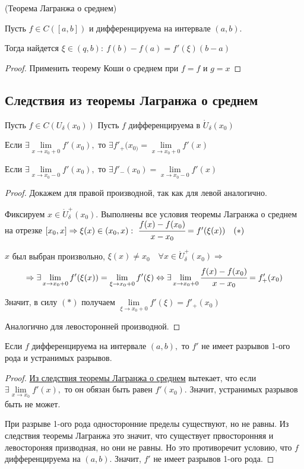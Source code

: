 \begin{corollary}
	\hypertarget{thrm5.11cor}{(Теорема Лагранжа о среднем)} Пусть $f \in C([a, b])$ и дифференцируема на интервале $(a, b)$.
	
	Тогда найдется $\xi \in (q, b): \ f(b) - f(a) = f'(\xi)(b-a)$
\end{corollary}
\begin{proof}
	Применить теорему Коши о среднем при $f = f$ и $g = x$
\end{proof}

\subsection{Следствия из теоремы Лагранжа о среднем}

\begin{theorem}
	Пусть $f \in C(U_{\delta}(x_{0})) $ Пусть $f$ дифференцируема в $\mathring{U}_{\delta}(x_{0})$
	
	Если $\exists \lim\limits_{x \to x_{0}+0} f'(x_{0}),$ то $\exists f'_{+}(x_{0)} = \lim\limits_{x\to x_{0}+0} f'(x)$
	
	Если $\exists \lim\limits_{x \to x_{0}-0} f'(x_{0}),$ то $\exists f'_{-}(x_{0}) = \lim\limits_{x\to x_{0}-0} f'(x)$
\end{theorem}
\begin{proof}
	Докажем для правой производной, так как для левой аналогично.
	
	Фиксируем $x\in \mathring{U}^{+}_{\delta}(x_{0})$. Выполнены все условия теоремы Лагранжа о среднем на отрезке $[x_{0}, x] \Rightarrow \xi(x) \in (x_{0}, x):\  \cfrac{f(x) - f(x_{0})}{x-x_{0}} = f'(\xi(x)) \quad (*)$
	
	$x$ был выбран произвольно, $\xi(x) \neq x_{0} \quad \forall x \in \mathring{U}^{+}_{\delta}(x_{0}) \Rightarrow $
	$$\Rightarrow \exists \lim\limits_{x \to x_{0}+0} f'(\xi(x)) =\lim\limits_{\xi \to x_{0}+0} f'(\xi) \Leftrightarrow \exists \lim\limits_{x \to x_{0}+0} \cfrac{f(x) - f(x_{0})}{x-x_{0}} = f'_{+}(x_{0})$$
	
	Значит, в силу $(*)$ получаем
	$
	\lim\limits_{\xi \to x_{0}+0} f'(\xi) = f'_{+}(x_{0})
	$
	
	Аналогично для левосторонней производной.
\end{proof}

\begin{corollary}
	Если $f$ дифференцируема на интервале $(a, b),$ то $f'$ не имеет разрывов 1-ого рода и устранимых разрывов.
\end{corollary}
\begin{proof}
	\hyperlink{thrm5.11cor}{Из следствия теоремы Лагранжа о среднем} вытекает, что если $\exists \lim\limits_{x\to x_{0}} f'(x),$ то он обязан быть равен $f'(x_{0})$. Значит, устранимых разрывов быть не может.
	
	При разрыве 1-ого рода односторонние пределы существуют, но не равны. Из следствия теоремы Лагранжа это значит, что существует првосторонняя и левостороняя призводная, но они не равны. Но это противоречит условию, что $f$ дифференцируема на $(a, b)$. Значит, $f'$ не имеет разрывов 1-ого рода. 
	
\end{proof}


